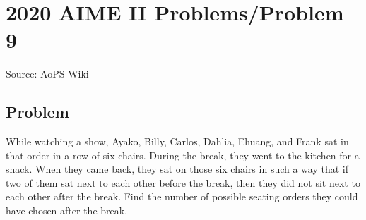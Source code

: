 \documentclass[12pt]{article}
\begin{document}
\section*{{2020 AIME II Problems/Problem 9}}
Source: AoPS Wiki

\subsection*{Problem}
While watching a show, Ayako, Billy, Carlos, Dahlia, Ehuang, and Frank sat in that order in a row of six chairs. During the break, they went to the kitchen for a snack. When they came back, they sat on those six chairs in such a way that if two of them sat next to each other before the break, then they did not sit next to each other after the break. Find the number of possible seating orders they could have chosen after the break.
\end{document}
